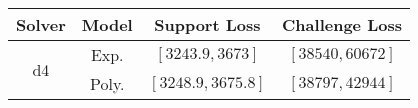 \begin{tabular}{cc|c|c} 
\hline 
 Solver & Model & Support Loss  & Challenge Loss \tabularnewline\hline 
\hline 
\multirow{2}{*}{d4} & Exp. & $\left[3243.9,3673\right]$ & $\left[38540,60672\right]$ \tabularnewline 
 & Poly. & $\left[3248.9,3675.8\right]$ & $\left[38797,42944\right]$ \tabularnewline 
\hline 
\end{tabular} 

